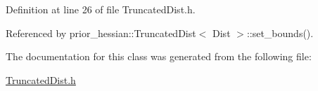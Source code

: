 Definition at line 26 of file Truncated\+Dist.\+h.



Referenced by prior\+\_\+hessian\+::\+Truncated\+Dist$<$ Dist $>$\+::set\+\_\+bounds().



The documentation for this class was generated from the following file\+:\begin{DoxyCompactItemize}
\item 
\hyperlink{TruncatedDist_8h}{Truncated\+Dist.\+h}\end{DoxyCompactItemize}
